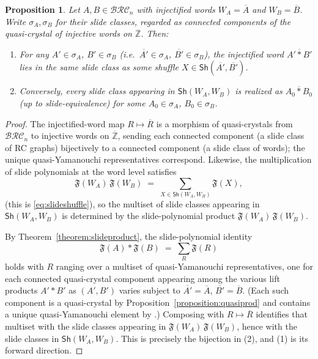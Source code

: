 \documentclass[pdflatex,sn-mathphys-num]{sn-jnl}
\numberwithin{equation}{subsection}
\newcommand{\BRC}{\mathcal{BRC}}
\theoremstyle{thmstyleone}
\newtheorem{proposition}[lemma]{Proposition}
\theoremstyle{thmstylethree}
\theoremstyle{thmstyletwo}
\begin{document}
\begin{proposition}\label{proposition:liftshufflewords}
Let $A, B\in\BRC_n$ with injectified words $W_A=\overline{A}$ and $W_B=\overline{B}$. Write $\sigma_A,\sigma_B$ for their slide classes, regarded as connected components of the quasi-crystal of injective words on $\overline{\mathbb{Z}}$. Then:
\begin{enumerate}
\item For any $A'\in\sigma_A$, $B'\in\sigma_B$ (i.e.\ $\overline{A'}\in\sigma_A$, $\overline{B'}\in\sigma_B$), the injectified word $\overline{A'*B'}$ lies in the same slide class as some shuffle $X\in\mathsf{Sh}(\overline{A'},\overline{B'})$.
\item Conversely, every slide class appearing in $\mathsf{Sh}(W_A,W_B)$ is realized as $\overline{A_0*B_0}$ (up to slide-equivalence) for some $A_0\in\sigma_A$, $B_0\in\sigma_B$.
\end{enumerate}
\end{proposition}
\begin{proof}

The injectified-word map $R\mapsto\overline{R}$ is a morphism of quasi-crystals from $\BRC_n$ to injective words on $\overline{\mathbb{Z}}$, sending each connected component (a slide class of RC graphs) bijectively to a connected component (a slide class of words); the unique quasi-Yamanouchi representatives correspond. Likewise, the multiplication of slide polynomials at the word level satisfies
\[
\mathfrak{F}(W_A)\,\mathfrak{F}(W_B)\;=\;\sum_{X\in\mathsf{Sh}(W_A,W_B)}\mathfrak{F}(X),
\]
(this is \eqref{eq:slideshuffle}), so the multiset of slide classes appearing in $\mathsf{Sh}(W_A,W_B)$ is determined by the slide-polynomial product $\mathfrak{F}(W_A)\,\mathfrak{F}(W_B)$.

By Theorem~\ref{theorem:slideproduct}, the slide-polynomial identity
\[
\mathfrak{F}(A)*\mathfrak{F}(B)\;=\;\sum_{R}\mathfrak{F}(R)
\]
holds with $R$ ranging over a multiset of quasi-Yamanouchi representatives, one for each connected quasi-crystal component appearing among the various lift products $A'*B'$ as $(A',B')$ varies subject to $\overline{A'}=\overline{A}$, $\overline{B'}=\overline{B}$. (Each such component is a quasi-crystal by Proposition~\ref{proposition:quasiprod} and contains a unique quasi-Yamanouchi element by \cite[Proposition~4.6]{cain2023quasicrystals}.) Composing with $R\mapsto\overline{R}$ identifies that multiset with the slide classes appearing in $\mathfrak{F}(W_A)\,\mathfrak{F}(W_B)$, hence with the slide classes in $\mathsf{Sh}(W_A,W_B)$. This is precisely the bijection in (2), and (1) is its forward direction.
\end{proof}
\end{document}
